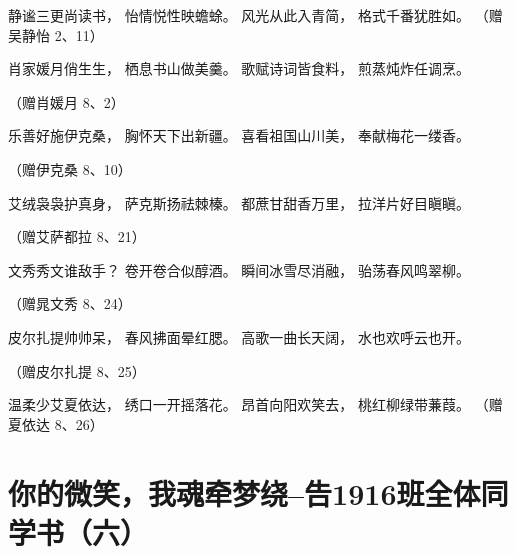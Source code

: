 \documentclass[openany]{ctexbook}
\begin{document}
静谧三更尚读书， 怡情悦性映蟾蜍。 风光从此入青简， 格式千番犹胜如。
（赠吴静怡 2、11）

肖家媛月俏生生， 栖息书山做美羹。 歌赋诗词皆食料， 煎蒸炖炸任调烹。

（赠肖媛月 8、2）

乐善好施伊克桑， 胸怀天下出新疆。 喜看祖国山川美， 奉献梅花一缕香。

（赠伊克桑 8、10）

艾绒袅袅护真身， 萨克斯扬祛棘榛。 都蔗甘甜香万里， 拉洋片好目瞋瞋。

（赠艾萨都拉 8、21）

文秀秀文谁敌手？ 卷开卷合似醇酒。 瞬间冰雪尽消融， 骀荡春风鸣翠柳。

（赠晁文秀 8、24）

皮尔扎提帅帅呆， 春风拂面晕红腮。 高歌一曲长天阔， 水也欢呼云也开。

（赠皮尔扎提 8、25）

温柔少艾夏依达， 绣口一开摇落花。 昂首向阳欢笑去， 桃红柳绿带蒹葭。
（赠夏依达 8、26）

\chapter*{你的微笑，我魂牵梦绕--告1916班全体同学书（六）}\label{letter6}
\end{document}
